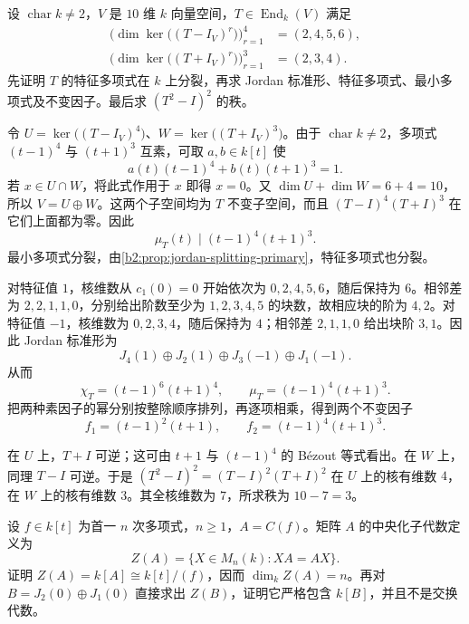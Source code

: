 \begin{exercise}
	\label{b2:ex:04-reconstruct-two-eigenvalues}
	设 \(\operatorname{char}k\ne2\)，\(V\) 是 \(10\) 维 \(k\) 向量空间，\(T\in\operatorname{End}_k(V)\) 满足
	\[
		\begin{aligned}
			\bigl(\dim\ker\bigl((T-I_V)^r\bigr)\bigr)_{r=1}^4&=(2,4,5,6),\\
			\bigl(\dim\ker\bigl((T+I_V)^r\bigr)\bigr)_{r=1}^3&=(2,3,4).
		\end{aligned}
	\]
	先证明 \(T\) 的特征多项式在 \(k\) 上分裂，再求 Jordan 标准形、特征多项式、最小多项式及不变因子。最后求 \((T^2-I)^2\) 的秩。
\end{exercise}

\begin{solution}
	令 \(U=\ker\bigl((T-I_V)^4\bigr)\)、\(W=\ker\bigl((T+I_V)^3\bigr)\)。由于 \(\operatorname{char}k\ne2\)，多项式 \((t-1)^4\) 与 \((t+1)^3\) 互素，可取 \(a,b\in k[t]\) 使
	\[
		a(t)(t-1)^4+b(t)(t+1)^3=1.
	\]
	若 \(x\in U\cap W\)，将此式作用于 \(x\) 即得 \(x=0\)。又 \(\dim U+\dim W=6+4=10\)，所以 \(V=U\oplus W\)。这两个子空间均为 \(T\) 不变子空间，而且 \((T-I)^4(T+I)^3\) 在它们上面都为零。因此
	\[
		\mu_T(t)\mid(t-1)^4(t+1)^3.
	\]
	最小多项式分裂，由\cref{b2:prop:jordan-splitting-primary}，特征多项式也分裂。

	对特征值 \(1\)，核维数从 \(c_1(0)=0\) 开始依次为 \(0,2,4,5,6\)，随后保持为 \(6\)。相邻差为 \(2,2,1,1,0\)，分别给出阶数至少为 \(1,2,3,4,5\) 的块数，故相应块的阶为 \(4,2\)。对特征值 \(-1\)，核维数为 \(0,2,3,4\)，随后保持为 \(4\)；相邻差 \(2,1,1,0\) 给出块阶 \(3,1\)。因此 Jordan 标准形为
	\[
		J_4(1)\oplus J_2(1)\oplus J_3(-1)\oplus J_1(-1).
	\]
	从而
	\[
		\chi_T=(t-1)^6(t+1)^4,\qquad \mu_T=(t-1)^4(t+1)^3.
	\]
	把两种素因子的幂分别按整除顺序排列，再逐项相乘，得到两个不变因子
	\[
		f_1=(t-1)^2(t+1),\qquad f_2=(t-1)^4(t+1)^3.
	\]

	在 \(U\) 上，\(T+I\) 可逆；这可由 \(t+1\) 与 \((t-1)^4\) 的 B\'ezout 等式看出。在 \(W\) 上，同理 \(T-I\) 可逆。于是 \((T^2-I)^2=(T-I)^2(T+I)^2\) 在 \(U\) 上的核有维数 \(4\)，在 \(W\) 上的核有维数 \(3\)。其全核维数为 \(7\)，所求秩为 \(10-7=3\)。
\end{solution}

\begin{exercise}
	\label{b2:ex:04-cyclic-centralizer}
	设 \(f\in k[t]\) 为首一 \(n\) 次多项式，\(n\ge1\)，\(A=C(f)\)。矩阵 \(A\) 的中央化子代数定义为
	\[
		Z(A)=\{X\in M_n(k):XA=AX\}.
	\]
	证明 \(Z(A)=k[A]\cong k[t]/(f)\)，因而 \(\dim_k Z(A)=n\)。再对 \(B=J_2(0)\oplus J_1(0)\) 直接求出 \(Z(B)\)，证明它严格包含 \(k[B]\)，并且不是交换代数。
\end{exercise}

